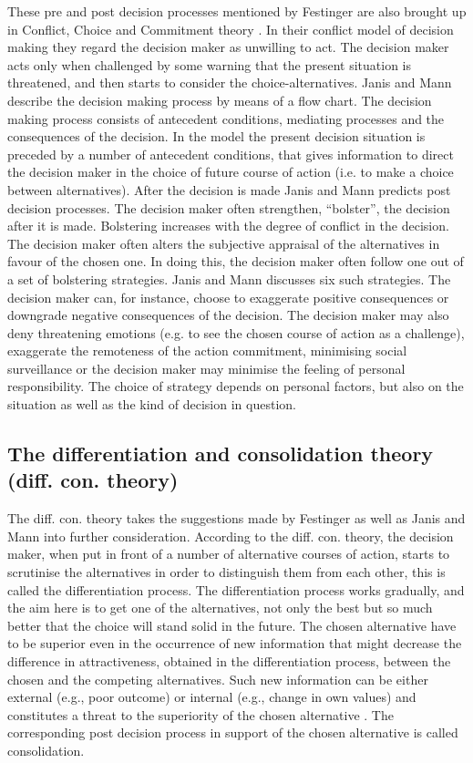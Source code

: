 \documentclass[jou,draftfirst,11pt]{apa6}
\begin{document}
These pre and post decision processes mentioned by Festinger
\parencite{festinger64} are also brought up in Conflict, Choice and
Commitment theory \parencite{JanisMann77}.  In their conflict model of
decision making they regard the decision maker as unwilling to act.
The decision maker acts only when challenged by some warning that the
present situation is threatened, and then starts to consider the
choice-alternatives.  Janis and Mann describe the decision making
process by means of a flow chart.  The decision making process
consists of antecedent conditions, mediating processes and the
consequences of the decision.  In the model the present decision
situation is preceded by a number of antecedent conditions, that gives
information to direct the decision maker in the choice of future
course of action (i.e.  to make a choice between alternatives).  After
the decision is made Janis and Mann predicts post decision processes.
The decision maker often strengthen, ``bolster'', the decision after it
is made.  Bolstering increases with the degree of conflict in the
decision.  The decision maker often alters the subjective appraisal of
the alternatives in favour of the chosen one.  In doing this, the
decision maker often follow one out of a set of bolstering strategies.
Janis and Mann discusses six such strategies.  The decision maker can,
for instance, choose to exaggerate positive consequences or downgrade
negative consequences of the decision.  The decision maker may also
deny threatening emotions (e.g. to see the chosen course of action as
a challenge), exaggerate the remoteness of the action commitment,
minimising social surveillance or the decision maker may minimise the
feeling of personal responsibility.  The choice of strategy depends on
personal factors, but also on the situation as well as the kind of
decision in question.

\subsection{The differentiation and consolidation theory
  (diff. con. theory)}

The diff. con. theory \parencite{svensson92b, Svensson95} takes the
suggestions made by Festinger \parencite{festinger64} as well as Janis
and Mann \parencite{JanisMann77} into further consideration.  According to the
diff. con. theory, the decision maker, when put in front of a number
of alternative courses of action, starts to scrutinise the
alternatives in order to distinguish them from each other, this is
called the differentiation process.  The differentiation process works
gradually, and the aim here is to get one of the alternatives, not
only the best but so much better that the choice will stand solid in
the future. The chosen alternative have to be superior even in the
occurrence of new information that might decrease the difference in
attractiveness, obtained in the differentiation process,  between the
chosen and the competing alternatives.  Such new information can be
either external (e.g., poor outcome) or internal (e.g., change in own
values) and constitutes a threat to the superiority of the chosen
alternative \parencite{svensson92a}.  The corresponding post decision
process in support of the chosen alternative is called consolidation.
\end{document}
